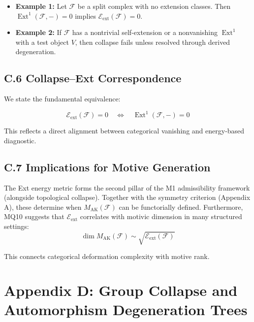 \documentclass[11pt]{article}
\DeclareMathOperator{\Ext}{Ext}
\begin{document}
\begin{itemize}
    \item \textbf{Example 1:} Let $\mathcal{F}$ be a split complex with no extension classes. Then $\Ext^1(\mathcal{F}, -) = 0$ implies $\mathcal{E}_{\mathrm{ext}}(\mathcal{F}) = 0$.
    \item \textbf{Example 2:} If $\mathcal{F}$ has a nontrivial self-extension or a nonvanishing $\Ext^1$ with a test object $V$, then collapse fails unless resolved through derived degeneration.
\end{itemize}

\subsection*{C.6 Collapse–Ext Correspondence}

We state the fundamental equivalence:

\begin{equation}
\mathcal{E}_{\mathrm{ext}}(\mathcal{F}) = 0 \quad \Longleftrightarrow \quad \Ext^1(\mathcal{F}, -) = 0
\end{equation}

This reflects a direct alignment between categorical vanishing and energy-based diagnostic.

\subsection*{C.7 Implications for Motive Generation}

The Ext energy metric forms the second pillar of the M1 admissibility framework (alongside topological collapse). Together with the symmetry criterion (Appendix A), these determine when $M_{\mathrm{AK}}(\mathcal{F})$ can be functorially defined. Furthermore, MQ10 suggests that $\mathcal{E}_{\mathrm{ext}}$ correlates with motivic dimension in many structured settings:
\[
\dim M_{\mathrm{AK}}(\mathcal{F}) \sim \sqrt{\mathcal{E}_{\mathrm{ext}}(\mathcal{F})}
\]

This connects categorical deformation complexity with motive rank.

\FloatBarrier



\section*{Appendix D: Group Collapse and Automorphism Degeneration Trees}
\end{document}
